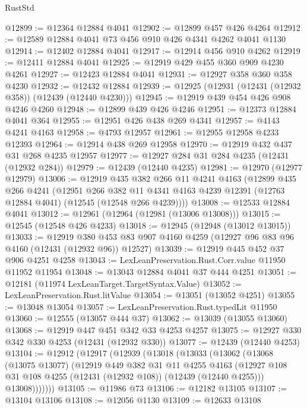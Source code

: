 \begin{lexlean}{RustStd}
\begin{coremodule}
@12899 := @12364 @12884 @4041
@12902 := @12899 @457 @426 @4264
@12912 := @12589 @12884 @4041 @73 @456 @910 @426 @4341 @4262 @4041 @1130
@12914 := @12402 @12884 @4041
@12917 := @12914 @456 @910 @4262
@12919 := @12411 @12884 @4041
@12925 := @12919 @429 @455 @360 @909 @4230 @4261
@12927 := @12423 @12884 @4041
@12931 := @12927 @358 @360 @358 @4230
@12932 := @12432 @12884
@12939 := @12925 (@12931 (@12431 (@12932 @358)) (@12439 (@12440 @4230)))
@12945 := @12919 @439 @454 @426 @908 @4246 @4260
@12948 := @12899 @439 @426 @4246
@12951 := @12373 @12884 @4041 @364
@12955 := @12951 @426 @438 @269 @4341
@12957 := @4143 @4241 @4163
@12958 := @4793 @12957
@12961 := @12955 @12958 @4233 @12393
@12964 := @12914 @438 @269 @12958
@12970 := @12919 @432 @437 @31 @268 @4235 @12957
@12977 := @12927 @284 @31 @284 @4235 (@12431 (@12932 @284))
@12979 := @12439 (@12440 @4235)
@12981 := @12970 (@12977 @12979)
@13006 := @12919
    @435
    @382
    @266
    @11
    @4241
    @4163
    (@12899
      @435
      @266
      @4241
      (@12951
        @266
        @382
        @11
        @4341
        @4163
        @4239
        @12391
        (@12763 @12884 @4041)
        (@12545 (@12548 @266 @4239))))
@13008 := @12533 @12884 @4041
@13012 := @12961 (@12964 (@12981 (@13006 @13008)))
@13015 := @12545 (@12548 @426 @4233)
@13018 := @12945 (@12948 (@13012 @13015))
@13033 := @12919
    @380
    @453
    @83
    @907
    @4160
    @4259
    (@12927 @96 @83 @96 @4160 (@12431 (@12932 @96)) @12527)
@13039 := @12919 @445 @452 @37 @906 @4251 @4258
@13043 := LexLeanPreservation.Rust.Corr.value @11950 @11952 @11954
@13048 := @13043 @12884 @4041 @37 @444 @4251
@13051 := @12181 (@11974 LexLeanTarget.TargetSyntax.Value)
@13052 := LexLeanPreservation.Rust.litValue
@13054 := @13051 (@13052 @4251)
@13055 := @13048 @13054
@13057 := LexLeanPreservation.Rust.typedLit @11950
@13060 := @12555 (@13057 @444 @37)
@13062 := @13039 (@13055 @13060)
@13068 := @12919 @447 @451 @342 @33 @4253 @4257
@13075 := @12927 @330 @342 @330 @4253 (@12431 (@12932 @330))
@13077 := @12439 (@12440 @4253)
@13104 := @12912
    (@12917
      (@12939
        (@13018
          (@13033
            (@13062
              (@13068
                (@13075 @13077)
                (@12919
                  @449
                  @382
                  @31
                  @11
                  @4255
                  @4163
                  (@12927 @108 @31 @108 @4255 (@12431 (@12932 @108)) (@12439 (@12440 @4255)))
                  @13008)))))))
@13105 := @11986 @73
@13106 := @12182 @13105
@13107 := @13104 @13106
@13108 := @12056 @1130
@13109 := @12633 @13108

\end{coremodule}
\end{lexlean}
